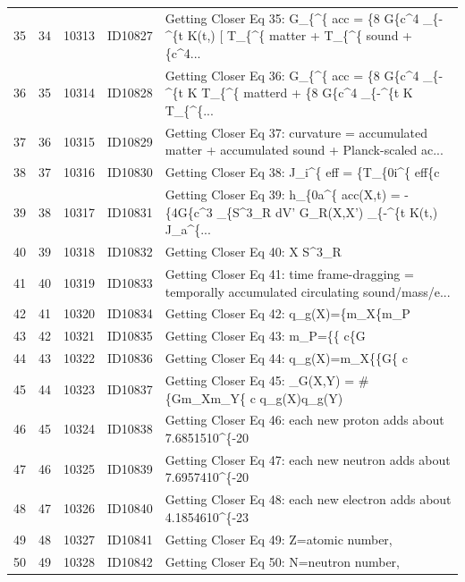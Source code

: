 \documentclass[11pt]{article}
\theoremstyle{remark}
\begin{document}
\begin{table}[H]
\begin{tabularx}{\textwidth}{rrrrL{7.2cm}}
35 & 34 & 10313 & ID10827 & Getting Closer Eq 35: G\_\{\textasciicircum{}\{ acc = \{8 G\{c\textasciicircum{}4 \_\{-\textasciicircum{}\{t K(t,) [ T\_\{\textasciicircum{}\{ matter + T\_\{\textasciicircum{}\{ sound + \{c\textasciicircum{}4... \\
36 & 35 & 10314 & ID10828 & Getting Closer Eq 36: G\_\{\textasciicircum{}\{ acc = \{8 G\{c\textasciicircum{}4 \_\{-\textasciicircum{}\{t K T\_\{\textasciicircum{}\{ matterd + \{8 G\{c\textasciicircum{}4 \_\{-\textasciicircum{}\{t K T\_\{\textasciicircum{}\{... \\
37 & 36 & 10315 & ID10829 & Getting Closer Eq 37: curvature = accumulated matter + accumulated sound + Planck-scaled ac... \\
38 & 37 & 10316 & ID10830 & Getting Closer Eq 38: J\_i\textasciicircum{}\{ eff = \{T\_\{0i\textasciicircum{}\{ eff\{c \\
39 & 38 & 10317 & ID10831 & Getting Closer Eq 39: h\_\{0a\textasciicircum{}\{ acc(X,t) = -\{4G\{c\textasciicircum{}3 \_\{S\textasciicircum{}3\_R dV' G\_R(X,X') \_\{-\textasciicircum{}\{t K(t,) J\_a\textasciicircum{}\{... \\
40 & 39 & 10318 & ID10832 & Getting Closer Eq 40: X S\textasciicircum{}3\_R \\
41 & 40 & 10319 & ID10833 & Getting Closer Eq 41: time frame-dragging = temporally accumulated circulating sound/mass/e... \\
42 & 41 & 10320 & ID10834 & Getting Closer Eq 42: q\_g(X)=\{m\_X\{m\_P \\
43 & 42 & 10321 & ID10835 & Getting Closer Eq 43: m\_P=\{\{ c\{G \\
44 & 43 & 10322 & ID10836 & Getting Closer Eq 44: q\_g(X)=m\_X\{\{G\{ c \\
45 & 44 & 10323 & ID10837 & Getting Closer Eq 45: \_G(X,Y) = \# \{Gm\_Xm\_Y\{ c q\_g(X)q\_g(Y) \\
46 & 45 & 10324 & ID10838 & Getting Closer Eq 46: each new proton adds about 7.6851510\textasciicircum{}\{-20 \\
47 & 46 & 10325 & ID10839 & Getting Closer Eq 47: each new neutron adds about 7.6957410\textasciicircum{}\{-20 \\
48 & 47 & 10326 & ID10840 & Getting Closer Eq 48: each new electron adds about 4.1854610\textasciicircum{}\{-23 \\
49 & 48 & 10327 & ID10841 & Getting Closer Eq 49: Z=atomic number, \\
50 & 49 & 10328 & ID10842 & Getting Closer Eq 50: N=neutron number, \\

\end{tabularx}
\end{table}
\end{document}
